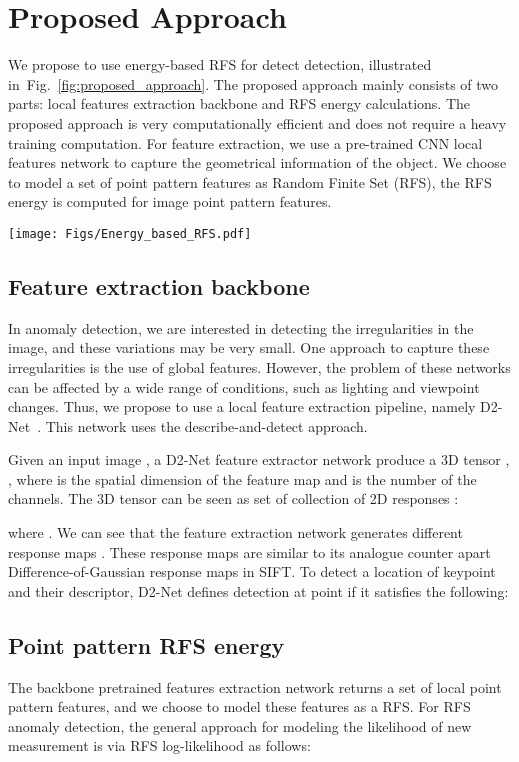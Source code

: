\documentclass[journal]{IEEEtran}
\let\MYoriglatexcaption\caption
\renewcommand{\caption}[2][\relax]{\MYoriglatexcaption[#2]{#2}}
\begin{document}
\section{Proposed Approach}
\label{Sec:proposed_appraoch}
We propose to use energy-based RFS for detect detection, illustrated in~Fig.~\ref{fig:proposed_approach}. The proposed approach mainly consists of two parts: local features extraction backbone and RFS energy calculations. The proposed approach is very computationally efficient and does not require a heavy training computation. For feature extraction, we use a pre-trained CNN local features network to capture the geometrical information of the object. We choose to model a set of point pattern features as Random Finite Set (RFS), the RFS energy is computed for image point pattern features.
\begin{figure*}
	\texttt{[image: Figs/Energy\_based\_RFS.pdf]}
	\caption{Our proposed energy-based RFS of point pattern features for anomaly detection.}
	\label{fig:proposed_approach}
\end{figure*} 

\subsection{Feature extraction backbone}

In anomaly detection, we are interested in detecting the irregularities in the image, and these variations may be very small. One approach to capture these irregularities is the use of global features. However, the problem of these networks can be affected by a wide range of conditions, such as lighting and viewpoint changes. Thus, we propose to use a local feature extraction pipeline, namely D2-Net~\cite{dusmanu2019d2}. This network uses the describe-and-detect approach.

Given an input image , a D2-Net feature extractor network  produce a 3D tensor ,  , where  is the spatial dimension of the feature map and  is the number of the channels. The 3D tensor  can be seen as set of collection of 2D responses :


where . We can see that the feature extraction  network generates  different response maps . These response maps are similar to its analogue counter apart  Difference-of-Gaussian response maps in SIFT. To detect a location of keypoint and their descriptor, D2-Net defines detection at point  if  it satisfies the following:



\subsection{Point pattern RFS energy}
The backbone pretrained features extraction network returns a set of local point pattern features, and we choose to model these features as a RFS. For RFS anomaly detection, the general approach for modeling the likelihood of new measurement  is via RFS log-likelihood as follows:
\end{document}
